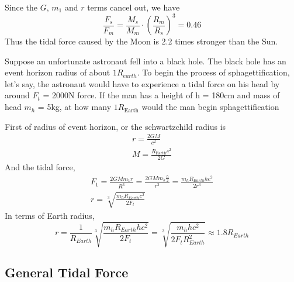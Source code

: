 \documentclass[10pt, a4paper]{article}
\begin{document}
\begin{tcolorbox}[colback=blue!5!white,colframe=blue!75!black,title=Solution]

Since the $G$, $m_1$ and $r$ terms cancel out, we have
\begin{equation*}
    \frac{F_s}{F_m} = \frac{M_s}{M_m} \cdot \left( \frac{R_m}{R_s} \right)^3 = 0.46
\end{equation*}
Thus the tidal force caused by the Moon is 2.2 times stronger than the Sun.

\end{tcolorbox}
\begin{tcolorbox}[colback=blue!5!white,colframe=blue!75!black,title=Problem]
Suppose an unfortunate astronaut fell into a black hole. The black hole has an event horizon radius of about $1R_{earth}. $
To begin the process of sphagettification, let's say, the astronaut would have to experience a tidal force on his head by around $F_t$ = 2000N force. If the man has a height of h = 180cm and mass of head $m_h$ = 5kg, at how many $1R_{\mathrm{Earth}}$ would the man begin sphagettification
\end{tcolorbox}
\begin{tcolorbox}[colback=blue!5!white,colframe=blue!75!black,title=Solution]

First of radius of event horizon, or the schwartzchild radius is 
\begin{align*}
    r = \frac{2GM}{c^2} \\
    M = \frac{R_{\mathrm{Earth}}c^2}{2G}
\end{align*}
And the tidal force,
\begin{align*}
   F_{\text{t}}= \frac{2GMm_1r}{R^3} = \frac{2GMm_h\frac{h}{2}}{r^3} = \frac{m_hR_{Earth}hc^2}{2r^3} \\
   r = \sqrt[3]{\frac{m_hR_{Earth}c^2}{2F_t}}
\end{align*}
In terms of Earth radius,
\begin{equation*}
     r = \frac{1}{R_{Earth}} \sqrt[3]{\frac{m_hR_{Earth}hc^2}{2F_t}} =  \sqrt[3]{\frac{m_hhc^2}{2F_tR_{Earth}^2}} \approx 1.8 R_{Earth}
\end{equation*}
\end{tcolorbox}



\subsection{General Tidal Force}
\end{document}
